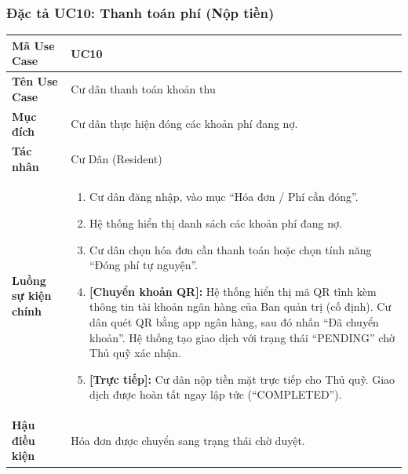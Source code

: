 \documentclass[12pt,a4paper]{article}
\begin{document}
\subsubsection{Đặc tả UC10: Thanh toán phí (Nộp tiền)}
\begin{table}[H]
    \centering
    \renewcommand{\arraystretch}{1.2}
    \begin{tabularx}{\textwidth}{|l|X|}
    \hline
    \textbf{Mã Use Case} & \textbf{UC10} \\
    \hline
    \textbf{Tên Use Case} & Cư dân thanh toán khoản thu \\
    \hline
    \textbf{Mục đích} & Cư dân thực hiện đóng các khoản phí đang nợ. \\
    \hline
    \textbf{Tác nhân} & Cư Dân (Resident) \\
    \hline
    \textbf{Luồng sự kiện chính} &
    \begin{enumerate}
        \item Cư dân đăng nhập, vào mục ``Hóa đơn / Phí cần đóng''.
        \item Hệ thống hiển thị danh sách các khoản phí đang nợ.
        \item Cư dân chọn hóa đơn cần thanh toán hoặc chọn tính năng ``Đóng phí tự nguyện''.
        \item \textbf{[Chuyển khoản QR]:} Hệ thống hiển thị mã QR tĩnh kèm thông tin tài khoản ngân hàng của Ban quản trị (cố định). Cư dân quét QR bằng app ngân hàng, sau đó nhấn ``Đã chuyển khoản''. Hệ thống tạo giao dịch với trạng thái ``PENDING'' chờ Thủ quỹ xác nhận.
        \item \textbf{[Trực tiếp]:} Cư dân nộp tiền mặt trực tiếp cho Thủ quỹ. Giao dịch được hoàn tất ngay lập tức (``COMPLETED'').
    \end{enumerate} \\
    \hline
    \textbf{Hậu điều kiện} & Hóa đơn được chuyển sang trạng thái chờ duyệt. \\
    \hline
    \end{tabularx}
\end{table}

\end{document}
